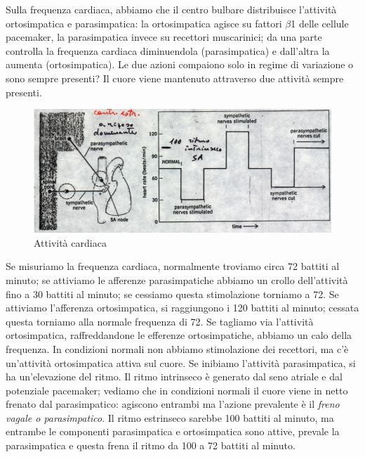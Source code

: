 \documentclass[a4paper,12pt]{article}
\begin{document}
Sulla frequenza cardiaca, abbiamo che il centro bulbare distribuisce l'attività ortosimpatica e parasimpatica: la ortosimpatica agisce su fattori $\beta$1 delle cellule pacemaker, la parasimpatica invece su recettori muscarinici; da una parte controlla la frequenza cardiaca diminuendola (parasimpatica) e dall'altra la aumenta (ortosimpatica).
Le due azioni compaiono solo in regime di variazione o sono sempre presenti? Il cuore viene mantenuto attraverso due attività sempre presenti. 
\begin{figure}[H]
\centering
\includegraphics[scale=0.45]{immagine/att_card.jpg}
\caption{Attività cardiaca}
\end{figure}
Se misuriamo la frequenza cardiaca, normalmente troviamo circa 72 battiti al minuto; se attiviamo le afferenze parasimpatiche abbiamo un crollo dell'attività fino a 30 battiti al minuto; se cessiamo questa stimolazione torniamo a 72. Se attiviamo l'afferenza ortosimpatica, si raggiungono i 120 battiti al minuto; cessata questa torniamo alla normale frequenza di 72. Se tagliamo via l'attività ortosimpatica, raffreddandone le efferenze ortosimpatiche, abbiamo un calo della frequenza. In condizioni normali non abbiamo stimolazione dei recettori, ma c'è un'attività ortosimpatica attiva sul cuore. Se inibiamo l'attività parasimpatica, si ha un'elevazione del ritmo. Il ritmo intrinseco è generato dal seno atriale e dal potenziale pacemaker; vediamo che in condizioni normali il cuore viene in netto frenato dal parasimpatico: agiscono entrambi ma l'azione prevalente è il \emph{freno vagale o parasimpatico}. Il ritmo estrinseco sarebbe 100 battiti al minuto, ma entrambe le componenti parasimpatica e ortosimpatica sono attive, prevale la parasimpatica e questa frena il ritmo da 100 a 72 battiti al minuto.
\end{document}

